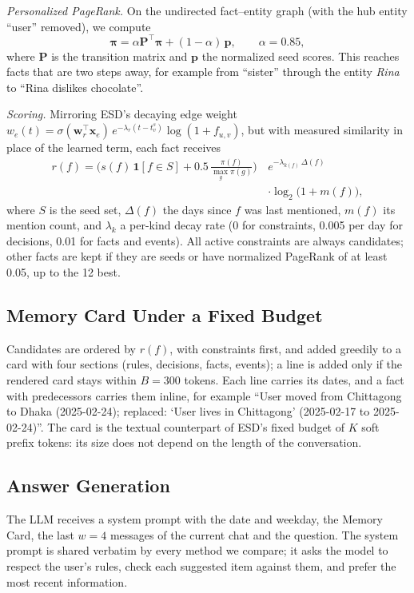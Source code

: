 \documentclass[conference]{IEEEtran}
\begin{document}
\textit{Personalized PageRank.} On the undirected fact--entity graph (with the hub entity ``user'' removed), we compute \cite{b_ppr,b_hipporag}
\begin{equation}
\boldsymbol{\pi} = \alpha \mathbf{P}^{\top} \boldsymbol{\pi} + (1 - \alpha)\, \mathbf{p}, \qquad \alpha = 0.85,
\end{equation}
where $\mathbf{P}$ is the transition matrix and $\mathbf{p}$ the normalized seed scores. This reaches facts that are two steps away, for example from ``sister'' through the entity \emph{Rina} to ``Rina dislikes chocolate''.

\textit{Scoring.} Mirroring ESD's decaying edge weight $w_e(t) = \sigma(\mathbf{w}_r^{\top}\mathbf{x}_e)\, e^{-\lambda_r (t - t_v^s)} \log(1 + f_{u,v})$, but with measured similarity in place of the learned term, each fact receives
\begin{equation}
\begin{split}
r(f) = \Big(s(f)\,\mathbf{1}[f \in S] + 0.5\,\tfrac{\pi(f)}{\max_g \pi(g)}\Big)\, &e^{-\lambda_{k(f)}\,\Delta(f)} \\
 &\cdot \log_2\!\big(1 + m(f)\big),
\end{split}
\end{equation}
where $S$ is the seed set, $\Delta(f)$ the days since $f$ was last mentioned, $m(f)$ its mention count, and $\lambda_{k}$ a per-kind decay rate (0 for constraints, 0.005 per day for decisions, 0.01 for facts and events). All active constraints are always candidates; other facts are kept if they are seeds or have normalized PageRank of at least 0.05, up to the 12 best.

\subsection{Memory Card Under a Fixed Budget}
Candidates are ordered by $r(f)$, with constraints first, and added greedily to a card with four sections (rules, decisions, facts, events); a line is added only if the rendered card stays within $B = 300$ tokens. Each line carries its dates, and a fact with predecessors carries them inline, for example ``User moved from Chittagong to Dhaka (2025-02-24); replaced: `User lives in Chittagong' (2025-02-17 to 2025-02-24)''. The card is the textual counterpart of ESD's fixed budget of $K$ soft prefix tokens: its size does not depend on the length of the conversation.

\subsection{Answer Generation}
The LLM receives a system prompt with the date and weekday, the Memory Card, the last $w = 4$ messages of the current chat and the question. The system prompt is shared verbatim by every method we compare; it asks the model to respect the user's rules, check each suggested item against them, and prefer the most recent information.
\end{document}
